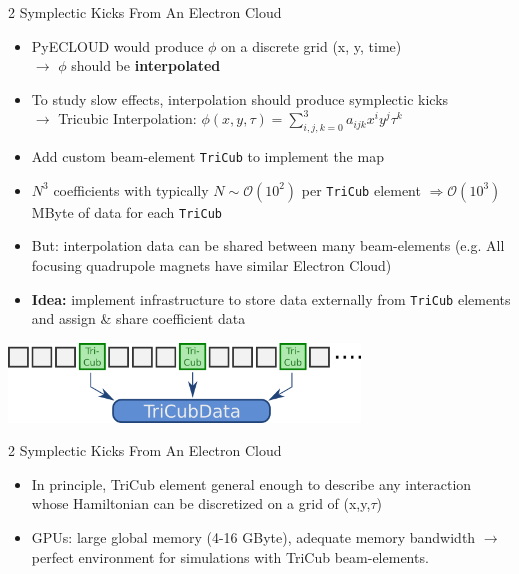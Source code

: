 \documentclass{beamer}
\begin{document}
\begin{frame}{2 Symplectic Kicks From An Electron Cloud}
\begin{itemize}
    \item PyECLOUD would produce $\phi$ on a discrete grid (x, y, time)\\
    $\rightarrow$ $\phi$ should be \textbf{interpolated}
    \item To study slow effects, interpolation should produce symplectic kicks \\
    $\rightarrow$  Tricubic Interpolation: $\phi(x,y,\tau) = \sum_{i,j,k=0}^3 a_{ijk} x^i y^j \tau^k$
    \item Add custom beam-element \texttt{TriCub} to implement the map
    \item $N^3$ coefficients with typically $N\sim \mathcal{O}(10^2)$ per \texttt{TriCub} element 
          $\Rightarrow \mathcal{O}(10^3)$ MByte of data for each \texttt{TriCub}
    \item But: interpolation data can be shared between many beam-elements (e.g. All focusing quadrupole magnets have similar Electron Cloud)
    \item \textbf{Idea:} implement infrastructure to store data externally from \texttt{TriCub} elements and assign \& share coefficient data
\end{itemize}
\begin{center}
\includegraphics[width=0.7\textwidth]{kostas_figs/tricub_tricubdata_overview.png}
\end{center}
\end{frame}


\begin{frame}{2 Symplectic Kicks From An Electron Cloud}
\begin{itemize}
    \item In principle, TriCub element general enough to describe any interaction whose Hamiltonian can be discretized on a grid of (x,y,$\tau$) 
    \item GPUs: large global memory (4-16 GByte), adequate memory bandwidth
    $\rightarrow$ perfect environment for simulations with TriCub beam-elements.
\end{itemize}

\end{frame}
\end{document}
